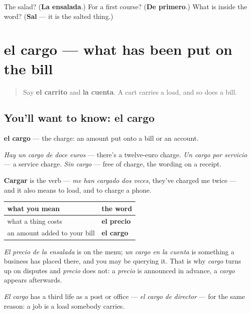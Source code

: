 \begin{tcolorbox}[breakable,colback=teal!4,colframe=teal!35!black,title={Before you move on}]
The salad? (\textbf{La ensalada}.) For a first course? (\textbf{De primero}.) What is inside the word? (\textbf{Sal} — it is the salted thing.)
\end{tcolorbox}
\section[el cargo]{el cargo — what has been put on the bill}

\label{lesson:ES-C456-cargo}



\begin{quote}
Say \textbf{el carrito} and \textbf{la cuenta}. A cart carries a load, and so does a bill.
\end{quote}

\subsection*{You'll want to know: el cargo}
\textbf{el cargo} — the charge: an amount put onto a bill or an account.

\emph{Hay un cargo de doce euros} — there's a twelve-euro charge. \emph{Un cargo por servicio} — a service charge. \emph{Sin cargo} — free of charge, the wording on a receipt.

\textbf{Cargar} is the verb — \emph{me han cargado dos veces}, they've charged me twice — and it also means to load, and to charge a phone.

\begin{grammarlens}[title={Grammar Lens: cargo is not precio}]
\noindent
\begin{tabularx}{\linewidth}{@{}>{\raggedright\arraybackslash}X>{\raggedright\arraybackslash}X@{}}
\toprule
\textbf{what you mean} & \textbf{the word} \\
\midrule
what a thing costs & \textbf{el precio} \\
an amount added to your bill & \textbf{el cargo} \\
\bottomrule
\end{tabularx}

\emph{El precio de la ensalada} is on the menu; \emph{un cargo en la cuenta} is something a business has placed there, and you may be querying it. That is why \emph{cargo} turns up on disputes and \emph{precio} does not: a \emph{precio} is announced in advance, a \emph{cargo} appears afterwards.

\emph{El cargo} has a third life as a post or office — \emph{el cargo de director} — for the same reason: a job is a load somebody carries.
\end{grammarlens}

